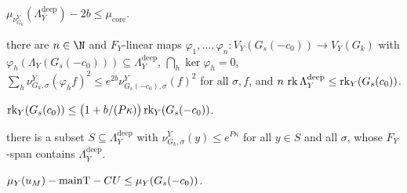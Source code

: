\begin{definition}
\begin{description}[style=unboxed,leftmargin=0pt]
\item[$\lifttwoP{RingAt}$] $\mu_{\nu^Y_{G_k}}(\Lambda^{\mathrm{deep}}_Y)-2b\le\mu_{\mathrm{core}}$.
\item[$\lifttwoP{MapsAt}$] there are $n\in\N$ and $F_Y$-linear maps $\varphi_1,\dots,\varphi_n\colon V_Y(G_s(-c_0))\to
V_Y(G_k)$ with $\varphi_h(\Lambda_Y(G_s(-c_0)))\subseteq\Lambda^{\mathrm{deep}}_Y$, $\bigcap_h\ker\varphi_h=0$,
$\sum_h\nu^Y_{G_k,\sigma}(\varphi_hf)^2\le e^{2b}\nu^Y_{G_s(-c_0),\sigma}(f)^2$ for all $\sigma,f$, and
$n\,\operatorname{rk}\Lambda^{\mathrm{deep}}_Y\le\operatorname{rk}_Y(G_s(c_0))$.
\item[$\lifttwoP{RkAt}$] $\operatorname{rk}_Y(G_s(c_0))\le\bigl(1+b/(P\kappa)\bigr)\operatorname{rk}_Y(G_s(-c_0))$.
\item[$\lifttwoP{GminAt}$] there is a subset $S\subseteq\Lambda^{\mathrm{deep}}_Y$ with
$\nu^Y_{G_k,\sigma}(y)\le e^{P\kappa}$ for all $y\in S$ and all $\sigma$, whose $F_Y$-span contains
$\Lambda^{\mathrm{deep}}_Y$.
\item[$\lifttwoP{FlatAt}(C)$] $\mu_Y(u_M)-\mathrm{mainT}-CU\le\mu_Y(G_s(-c_0))$.
\end{description}
\end{definition}

